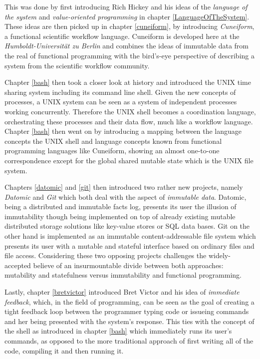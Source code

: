 This was done by first introducing Rich Hickey and his ideas of
the \textit{language of the system} and \textit{value-oriented
programming} in chapter \ref{LanguageOfTheSystem}.
These ideas are then picked up in chapter \ref{cuneiform},
by introducing \textit{Cuneiform}, a functional scientific workflow language.
Cuneiform is developed here at the \textit{Humboldt-Universität zu Berlin}
and combines the ideas of immutable data from the real of
functional programming with the bird's-eye perspective of describing
a system from the scientific workflow community.

Chapter \ref{bash} then took a closer look at history and introduced
the UNIX time sharing system including its command line shell.
Given the new concepts of processes, a UNIX system can be seen as
a system of independent processes working concurrently. Therefore
the UNIX shell becomes a coordination language, orchestrating
these processes and their data flow, much like a workflow language.
Chapter \ref{bash} then went on by introducing a mapping between
the language concepts the UNIX shell and language concepts known
from functional programming languages like Cuneiform, showing
an almost one-to-one correspondence except for the global shared mutable
state which is the UNIX file system.

Chapters \ref{datomic} and \ref{git} then introduced two
rather new projects, namely \textit{Datomic} and \textit{Git}
which both deal with the aspect of \textit{immutable data}.
Datomic, being a distributed and immutable facts log, presents
its user the illusion of immutability though being implemented
on top of already existing mutable distributed storage solutions
like key-value stores or SQL data bases. Git on the other hand
is implemented as an immutable content-addressable file system
which presents its user with a mutable and stateful interface
based on ordinary files and file access.
Considering these two opposing projects challenges the widely-accepted
believe of an insurmountable divide between both approaches:
mutability and statefulness versus immutability and functional programming.

Lastly, chapter \ref{bretvictor} introduced Bret Victor and his
idea of \textit{immediate feedback}, which, in the field of programming,
can be seen as the goal of creating a tight feedback loop between
the programmer typing code or issueing commands and her being presented
with the system's response. This ties with the concept of the shell as
introduced in chapter \ref{bash} which immediately runs its user's
commands, as opposed to the more traditional approach of first
writing all of the code, compiling it and then running it.
\newline

